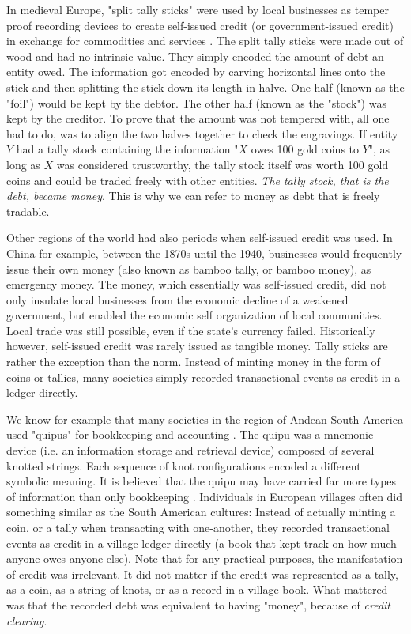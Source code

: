 \documentclass{article}
\begin{document}
In medieval Europe, "split tally sticks" were used by local businesses as temper proof recording devices to create self-issued credit (or government-issued credit) in exchange for commodities and services \cite{goetzmann_origins_2005}. The split tally sticks were made out of wood and had no intrinsic value. They simply encoded the amount of debt an entity owed. The information got encoded by carving horizontal lines onto the stick and then splitting the stick down its  length in halve. One half (known as the "foil") would be kept by the debtor. The other half (known as the "stock") was kept by the creditor. To prove that the amount was not tempered with, all one had to do, was to align the two halves together to check the engravings. If entity $Y$ had a tally stock containing the information "$X$ owes 100 gold coins to $Y$", as long as $X$ was considered trustworthy, the tally stock itself was worth 100 gold coins and could be traded freely with other entities. \textit{The tally stock, that is the debt, became money}. This is why we can refer to money as debt that is freely tradable.  

Other regions of the world had also periods when self-issued credit was used. In China for example, between the 1870s until the 1940, businesses would frequently issue their own money (also known as bamboo tally, or bamboo money), as emergency money. The money, which essentially was self-issued credit, did not only insulate local businesses from the economic decline of a weakened government, but enabled the economic self organization of local communities. Local trade was still possible, even if the state's currency failed. Historically however, self-issued credit was rarely issued as tangible money. Tally sticks are rather the exception than the norm. Instead of minting money in the form of coins or tallies, many societies simply recorded transactional events as credit in a ledger directly. 

We know for example that many societies in the region of Andean South America used "quipus" for bookkeeping and accounting \cite{benson_quipu_1975}. The quipu was a mnemonic device (i.e. an information storage and retrieval device) composed of several knotted strings. Each sequence of knot configurations encoded a different symbolic meaning. It is believed that the quipu may have carried far more types of information than only bookkeeping \cite{benson_quipu_1975}. Individuals in European villages often did something similar as the South American cultures: Instead of actually minting a coin, or a tally when transacting with one-another, they recorded transactional events as credit in a village ledger directly (a book that kept track on how much anyone owes anyone else). Note that for any practical purposes, the manifestation of credit was irrelevant. It did not matter if the credit was represented as a tally, as a coin, as a string of knots, or as a record in a village book. What mattered was that the recorded debt was equivalent to having "money", because of \textit{credit clearing}.
\end{document}
